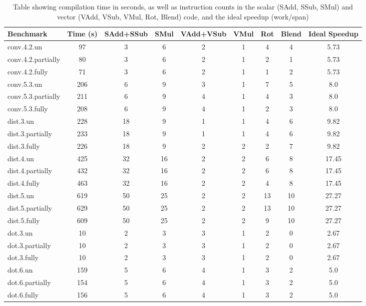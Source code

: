 \begin{table}
    \tiny
    \caption{Table showing compilation time in seconds, as well as instruction counts in the scalar (SAdd, SSub, SMul) and vector (VAdd, VSub, VMul, Rot, Blend) code, and the ideal speedup (work/span)}\label{tab:big-ass}
    \begin{tabular}{lcccccccc}
    \toprule
    Benchmark & Time (s) & SAdd+SSub & SMul & VAdd+VSub & VMul & Rot & Blend & Ideal Speedup\\\midrule
    conv.4.2.un & 97 & 3 & 6 & 2 & 1 & 4 & 4 & 5.73\\
    conv.4.2.partially & 80 & 3 & 6 & 2 & 1 & 2 & 1 & 5.73\\
    conv.4.2.fully & 71 & 3 & 6 & 2 & 1 & 1 & 2 & 5.73\\

    conv.5.3.un & 206 & 6 & 9 & 3 & 1 & 7 & 5 & 8.0\\
    conv.5.3.partially & 211 & 6 & 9 & 4 & 1 & 4 & 3 & 8.0\\
    conv.5.3.fully & 208 & 6 & 9 & 4 & 1 & 2 & 3 & 8.0\\

    dist.3.un & 228 & 18 & 9 & 1 & 1 & 4 & 6 & 9.82\\
    dist.3.partially & 233 & 18 & 9 & 1 & 1 & 4 & 6 & 9.82\\
    dist.3.fully & 226 & 18 & 9 & 2 & 2 & 2 & 7 & 9.82\\

    dist.4.un & 425 & 32 & 16 & 2 & 2 & 6 & 8 & 17.45\\
    dist.4.partially & 432 & 32 & 16 & 2 & 2 & 6 & 8 & 17.45\\
    dist.4.fully & 463 & 32 & 16 & 2 & 2 & 4 & 8 & 17.45\\

    dist.5.un & 619 & 50 & 25 & 2 & 2 & 13 & 10 & 27.27\\
    dist.5.partially & 629 & 50 & 25 & 2 & 2 & 13 & 10 & 27.27\\
    dist.5.fully & 609 & 50 & 25 & 2 & 2 & 9 & 10 & 27.27\\

    dot.3.un & 10 & 2 & 3 & 3 & 1 & 2 & 0 & 2.67\\
    dot.3.partially & 10 & 2 & 3 & 3 & 1 & 2 & 0 & 2.67\\
    dot.3.fully & 10 & 2 & 3 & 3 & 1 & 2 & 0 & 2.67\\

    dot.6.un & 159 & 5 & 6 & 4 & 1 & 3 & 2 & 5.0\\
    dot.6.partially & 154 & 5 & 6 & 4 & 1 & 3 & 2 & 5.0\\
    dot.6.fully & 156 & 5 & 6 & 4 & 1 & 3 & 2 & 5.0\\


\end{tabular}
\end{table}

